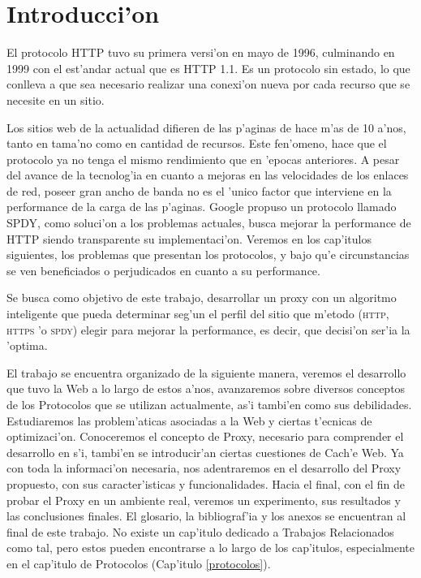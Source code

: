 \chapter{Introducci'on}

El protocolo HTTP tuvo su primera versi'on en mayo de 1996, culminando en 1999 con el est'andar actual que es HTTP 1.1. Es un protocolo sin estado, lo que conlleva a que sea necesario realizar una conexi'on nueva por cada recurso que se necesite en un sitio.

Los sitios web de la actualidad difieren de las p'aginas de hace m'as de 10 a'nos, tanto en tama'no como en cantidad de recursos. Este fen'omeno, hace que el protocolo ya no tenga el mismo rendimiento que en 'epocas anteriores. A pesar del avance de la tecnolog'ia en cuanto a mejoras en las velocidades de los enlaces de red, poseer gran ancho de banda no es el 'unico factor que interviene en la performance de la carga de las p'aginas.
Google propuso un protocolo llamado SPDY, como soluci'on a los problemas actuales, busca mejorar la performance de HTTP siendo transparente su implementaci'on.
Veremos en los cap'itulos siguientes, los problemas que presentan los protocolos, y bajo qu'e circunstancias se ven beneficiados o perjudicados en cuanto a su performance.

Se busca como objetivo de este trabajo, desarrollar un proxy con un algoritmo inteligente que pueda determinar seg'un el perfil del sitio que m'etodo (\textsc{http}, \textsc{https} 'o \textsc{spdy}) elegir para mejorar la performance, es decir, que decisi'on ser'ia la 'optima.

El trabajo se encuentra organizado de la siguiente manera, veremos el desarrollo que tuvo la Web a lo largo de estos a'nos, avanzaremos sobre diversos conceptos de los Protocolos que se utilizan actualmente, as'i tambi'en como sus debilidades. Estudiaremos las problem'aticas asociadas a la Web y ciertas t'ecnicas de optimizaci'on. Conoceremos el concepto de Proxy, necesario para comprender el desarrollo en s'i, tambi'en se introducir'an ciertas cuestiones de Cach'e Web. Ya con toda la informaci'on necesaria, nos adentraremos en el desarrollo del Proxy propuesto, con sus caracter'isticas y funcionalidades. Hacia el final, con el fin de probar el Proxy en un ambiente real, veremos un experimento, sus resultados y las conclusiones finales. El glosario, la bibliograf'ia y los anexos se encuentran al final de este trabajo. No existe un cap'itulo dedicado a Trabajos Relacionados como tal, pero estos pueden encontrarse a lo largo de los cap'itulos, especialmente en el cap'itulo de Protocolos (Cap'itulo \ref{protocolos}).
